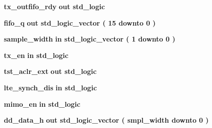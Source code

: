 \begin{DoxyCompactItemize}
{\bf tx\+\_\+outfifo\+\_\+rdy}  {\bfseries {\bfseries \textcolor{keywordflow}{out}\textcolor{vhdlchar}{ }}} {\bfseries \textcolor{comment}{std\+\_\+logic}\textcolor{vhdlchar}{ }} 
\item 
{\bf fifo\+\_\+q}  {\bfseries {\bfseries \textcolor{keywordflow}{out}\textcolor{vhdlchar}{ }}} {\bfseries \textcolor{comment}{std\+\_\+logic\+\_\+vector}\textcolor{vhdlchar}{ }\textcolor{vhdlchar}{(}\textcolor{vhdlchar}{ }\textcolor{vhdlchar}{ } \textcolor{vhdldigit}{15} \textcolor{vhdlchar}{ }\textcolor{keywordflow}{downto}\textcolor{vhdlchar}{ }\textcolor{vhdlchar}{ } \textcolor{vhdldigit}{0} \textcolor{vhdlchar}{ }\textcolor{vhdlchar}{)}\textcolor{vhdlchar}{ }} 
\item 
{\bf sample\+\_\+width}  {\bfseries {\bfseries \textcolor{keywordflow}{in}\textcolor{vhdlchar}{ }}} {\bfseries \textcolor{comment}{std\+\_\+logic\+\_\+vector}\textcolor{vhdlchar}{ }\textcolor{vhdlchar}{(}\textcolor{vhdlchar}{ }\textcolor{vhdlchar}{ } \textcolor{vhdldigit}{1} \textcolor{vhdlchar}{ }\textcolor{keywordflow}{downto}\textcolor{vhdlchar}{ }\textcolor{vhdlchar}{ } \textcolor{vhdldigit}{0} \textcolor{vhdlchar}{ }\textcolor{vhdlchar}{)}\textcolor{vhdlchar}{ }} 
\item 
{\bf tx\+\_\+en}  {\bfseries {\bfseries \textcolor{keywordflow}{in}\textcolor{vhdlchar}{ }}} {\bfseries \textcolor{comment}{std\+\_\+logic}\textcolor{vhdlchar}{ }} 
\item 
{\bf tst\+\_\+aclr\+\_\+ext}  {\bfseries {\bfseries \textcolor{keywordflow}{out}\textcolor{vhdlchar}{ }}} {\bfseries \textcolor{comment}{std\+\_\+logic}\textcolor{vhdlchar}{ }} 
\item 
{\bf lte\+\_\+synch\+\_\+dis}  {\bfseries {\bfseries \textcolor{keywordflow}{in}\textcolor{vhdlchar}{ }}} {\bfseries \textcolor{comment}{std\+\_\+logic}\textcolor{vhdlchar}{ }} 
\item 
{\bf mimo\+\_\+en}  {\bfseries {\bfseries \textcolor{keywordflow}{in}\textcolor{vhdlchar}{ }}} {\bfseries \textcolor{comment}{std\+\_\+logic}\textcolor{vhdlchar}{ }} 
\item 
{\bf dd\+\_\+data\+\_\+h}  {\bfseries {\bfseries \textcolor{keywordflow}{out}\textcolor{vhdlchar}{ }}} {\bfseries \textcolor{comment}{std\+\_\+logic\+\_\+vector}\textcolor{vhdlchar}{ }\textcolor{vhdlchar}{(}\textcolor{vhdlchar}{ }\textcolor{vhdlchar}{ }\textcolor{vhdlchar}{ }\textcolor{vhdlchar}{ }{\bfseries {\bf smpl\+\_\+width}} \textcolor{vhdlchar}{ }\textcolor{keywordflow}{downto}\textcolor{vhdlchar}{ }\textcolor{vhdlchar}{ } \textcolor{vhdldigit}{0} \textcolor{vhdlchar}{ }\textcolor{vhdlchar}{)}\textcolor{vhdlchar}{ }} 

\end{DoxyCompactItemize}

